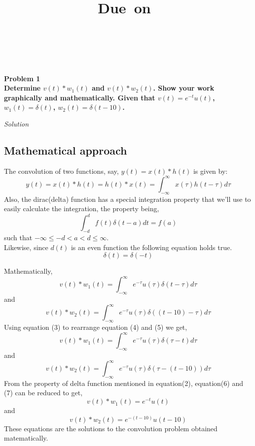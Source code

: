 \documentclass{article}[12 pt]
\title{
    \vspace{2in}
    \textmd{\textbf{\hmwkTitle}}\\
    \normalsize\vspace{0.1in}\small{Due\ on\ \hmwkDueDate}\\
    \vspace{0.1in}\large{\textit{\hmwkClassInstructor}}
    \vspace{3in}
}
\author{
    \textmd{\textbf{\huge{\hmwkAuthorName}}}\\ \\
    \textbf{\huge{\hmwkAuthorRoll}}
}
\date{}
\newcommand{
\problem}[2]
{\textbf{\huge Problem {#1} \\
\normalsize {#2}\\
}
}
\newcommand{\solution}{
\large{\textit{Solution}}
}
\begin{document}
\maketitle
\pagebreak
{}
\problem{1}{Determine $v(t)*w_1(t)$ and $v(t)*w_2(t)$. Show your work graphically and mathematically. Given that
$v(t)=e^{-t}u(t)$, 
$w_1(t)=\delta(t)$,  
$w_2(t)=\delta(t-10)$.}
\solution
\subsection*{Mathematical approach}
The convolution of two functions, say, $y(t)=x(t)*h(t)$ is given by:
\begin{equation}
y(t)=x(t)*h(t)=h(t)*x(t)=\int_{-\infty}^\infty x(\tau)h(t-\tau)d\tau
\end{equation}
Also, the dirac(delta) function has a special integration property that we'll use to easily calculate the integration, the property being,
\begin{equation}
\int_{-d}^{d} f(t) \delta(t-a)dt=f(a)
\end{equation}
such that $-\infty \leq -d < a < d \leq \infty$.\\ Likewise, since $d(t)$ is an even function the following equation holds true.
\begin{equation}
\delta(t)=\delta(-t)
\end{equation}

Mathematically,
\begin{equation}
v(t)*w_1(t)=\int_{-\infty}^\infty e^{-\tau}u(\tau)\delta(t-\tau)d\tau
\end{equation} 
and
\begin{equation}
v(t)*w_2(t)=\int_{-\infty}^\infty e^{-\tau}u(\tau)\delta((t-10)-\tau)d\tau
\end{equation} 
Using equation (3) to rearrange equation (4) and (5) we get,
\begin{equation}
v(t)*w_1(t)=\int_{-\infty}^\infty e^{-\tau}u(\tau)\delta(\tau-t)d\tau
\end{equation} 
and
\begin{equation}
v(t)*w_2(t)=\int_{-\infty}^\infty e^{-\tau}u(\tau)\delta(\tau-(t-10))d\tau
\end{equation} 
From the property of delta function mentioned in equation(2), equation(6) and (7) can be reduced to get,
\begin{equation}
v(t)*w_1(t)= e^{-t}u(t)
\end{equation} 
and
\begin{equation}
v(t)*w_2(t)=e^{-(t-10)}u(t-10)
\end{equation}
These equations are the solutions to the convolution problem obtained matematically.
\newpage
\end{document}
